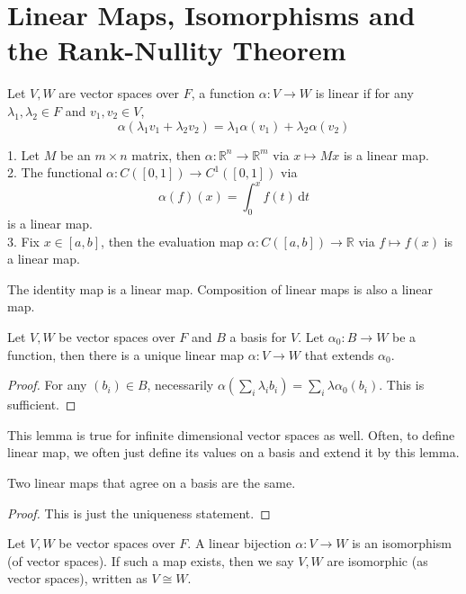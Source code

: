 \section{Linear Maps, Isomorphisms and the Rank-Nullity Theorem}
\begin{definition}
    Let $V,W$ are vector spaces over $F$, a function $\alpha:V\to W$ is linear if for any $\lambda_1,\lambda_2\in F$ and $v_1,v_2\in V$,
    $$\alpha(\lambda_1v_1+\lambda_2v_2)=\lambda_1\alpha(v_1)+\lambda_2\alpha(v_2)$$
\end{definition}
\begin{example}
    1. Let $M$ be an $m\times n$ matrix, then $\alpha:\mathbb R^n\to\mathbb R^m$ via $x\mapsto Mx$ is a linear map.\\
    2. The functional $\alpha:C([0,1])\to C^1([0,1])$ via
    $$\alpha(f)(x)=\int_0^xf(t)\,\mathrm dt$$
    is a linear map.\\
    3. Fix $x\in[a,b]$, then the evaluation map $\alpha:C([a,b])\to\mathbb R$ via $f\mapsto f(x)$ is a linear map.
\end{example}
\begin{remark}
    The identity map is a linear map.
    Composition of linear maps is also a linear map.
\end{remark}
\begin{lemma}
    Let $V,W$ be vector spaces over $F$ and $B$ a basis for $V$.
    Let $\alpha_0:B\to W$ be a function, then there is a unique linear map $\alpha:V\to W$ that extends $\alpha_0$.
\end{lemma}
\begin{proof}
    For any $(b_i)\in B$, necessarily $\alpha\left(\sum_i\lambda_ib_i\right)=\sum_i\lambda\alpha_0(b_i)$.
    This is sufficient.
\end{proof}
\begin{remark}
    This lemma is true for infinite dimensional vector spaces as well.
    Often, to define linear map, we often just define its values on a basis and extend it by this lemma.
\end{remark}
\begin{corollary}
    Two linear maps that agree on a basis are the same.
\end{corollary}
\begin{proof}
    This is just the uniqueness statement.
\end{proof}
\begin{definition}
    Let $V,W$ be vector spaces over $F$.
    A linear bijection $\alpha:V\to W$ is an isomorphism (of vector spaces).
    If such a map exists, then we say $V,W$ are isomorphic (as vector spaces), written as $V\cong W$.
\end{definition}
